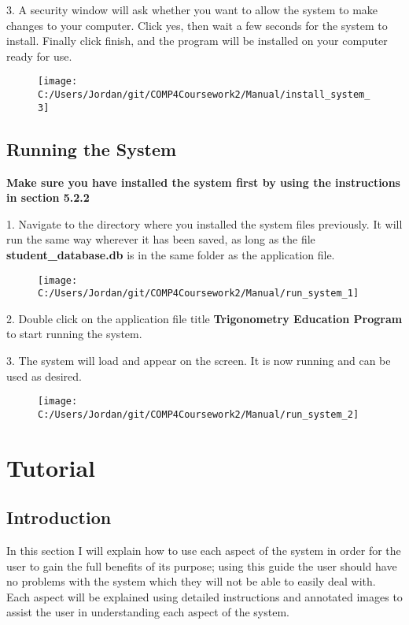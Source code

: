 3. A security window will ask whether you want to allow the system to make changes to your computer. Click yes, then wait a few seconds for the system to install. Finally click finish, and the program will be installed on your computer ready for use.

\begin{figure}[H]
    \texttt{[image: C:/Users/Jordan/git/COMP4Coursework2/Manual/install\_system\_3]}
\end{figure}

\subsection{Running the System}

\textbf{Make sure you have installed the system first by using the instructions in section 5.2.2}

1. Navigate to the directory where you installed the system files previously. It will run the same way wherever it has been saved, as long as the file \textbf{student\_database.db} is in the same folder as the application file.

\begin{figure}[H]
    \texttt{[image: C:/Users/Jordan/git/COMP4Coursework2/Manual/run\_system\_1]}
\end{figure}

2. Double click on the application file title \textbf{Trigonometry Education Program} to start running the system.

3. The system will load and appear on the screen. It is now running and can be used as desired.

\begin{figure}[H]
    \texttt{[image: C:/Users/Jordan/git/COMP4Coursework2/Manual/run\_system\_2]}
\end{figure}

\section{Tutorial}

\subsection{Introduction}

In this section I will explain how to use each aspect of the system in order for the user to gain the full benefits of its purpose; using this guide the user should have no problems with the system which they will not be able to easily deal with. Each aspect will be explained using detailed instructions and annotated images to assist the user in understanding each aspect of the system.

